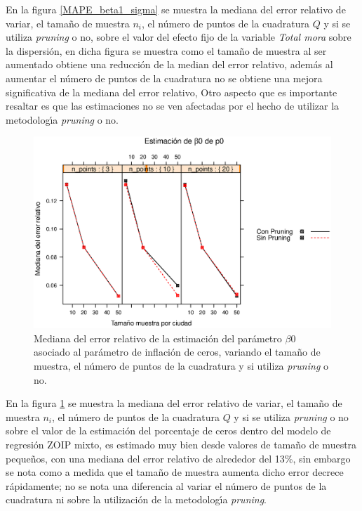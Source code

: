 En la figura \ref{MAPE_beta1_sigma} se muestra la mediana del error relativo de variar, el tama\~{n}o de muestra $n_i$, el n\'{u}mero de puntos de la cuadratura $Q$ y si se utiliza \textit{pruning} o no, sobre el valor del efecto fijo de la variable \textsl{Total mora} sobre la dispersi\'{o}n, en dicha figura se muestra como el tama\~{n}o de muestra al ser aumentado obtiene una reducci\'{o}n de la median del error relativo, adem\'{a}s al aumentar el n\'{u}mero de puntos de la cuadratura no se obtiene una mejora significativa de la mediana del error relativo, Otro aspecto que es importante resaltar es que las estimaciones no se ven afectadas por el hecho de utilizar la metodolog\'{\i}a \textit{pruning} o no.\\

\begin{figure}
	\begin{center}
		\includegraphics[scale=0.6]{MAPE_beta0_p0.eps}	
		\caption{Mediana del error relativo de la estimaci\'{o}n del par\'{a}metro $\beta0$ asociado al par\'{a}metro de inflaci\'{o}n de ceros, variando el tama\~{n}o de muestra, el n\'{u}mero de puntos de la cuadratura y si utiliza \textit{pruning} o no.}
		\label{MAPE_beta0_p0}
	\end{center}
\end{figure}

En la figura \ref{MAPE_beta0_p0} se muestra la mediana del error relativo de variar, el tama\~{n}o de muestra $n_i$, el n\'{u}mero de puntos de la cuadratura $Q$ y si se utiliza \textit{pruning} o no sobre el valor de la estimaci\'{o}n del porcentaje de ceros dentro del modelo de regresi\'{o}n ZOIP mixto, es estimado muy bien desde valores de tama\~{n}o de muestra peque\~{n}os, con una mediana del error relativo de alrededor del 13\%, sin embargo se nota como a medida que el tama\~{n}o de muestra aumenta dicho error decrece r\'{a}pidamente; no se nota una diferencia al variar el n\'{u}mero de puntos de la cuadratura ni sobre la utilizaci\'{o}n de la metodolog\'{\i}a \textit{pruning}.\\

